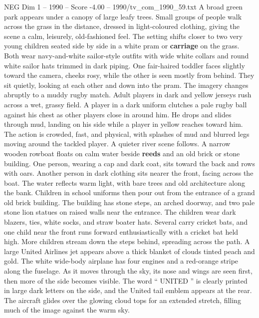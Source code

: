 \begin{textsample}{NEG Dim 1 – 1990 – Score -4.00 – 1990/tv\_com\_1990\_59.txt}  \label{ex:f1_neg_052}
A broad green park appears under a canopy of large leafy trees.
Small groups of people walk across the grass in the distance, dressed in light-coloured clothing, giving the scene a calm, leisurely, old-fashioned feel.
The setting shifts closer to two very young children seated side by side in a white pram or \textbf{carriage} on the grass.
Both wear navy-and-white sailor-style outfits with wide white collars and round white sailor hats trimmed in dark piping.
One fair-haired toddler faces slightly toward the camera, cheeks rosy, while the other is seen mostly from behind.
They sit quietly, looking at each other and down into the pram.
The imagery changes abruptly to a muddy rugby match.
Adult players in dark and yellow jerseys rush across a wet, grassy field.
A player in a dark uniform clutches a pale rugby ball against his chest as other players close in around him.
He drops and slides through mud, landing on his side while a player in yellow reaches toward him.
The action is crowded, fast, and physical, with splashes of mud and blurred legs moving around the tackled player.
A quieter river scene follows.
A narrow wooden rowboat floats on calm water beside \textbf{reeds} and an old brick or stone building.
One person, wearing a cap and dark coat, sits toward the back and rows with oars.
Another person in dark clothing sits nearer the front, facing across the boat.
The water reflects warm light, with bare trees and old architecture along the bank.
Children in school uniforms then pour out from the entrance of a grand old brick building.
The building has stone steps, an arched doorway, and two pale stone lion statues on raised walls near the entrance.
The children wear dark blazers, ties, white socks, and straw boater hats.
Several carry cricket bats, and one child near the front runs forward enthusiastically with a cricket bat held high.
More children stream down the steps behind, spreading across the path.
A large United Airlines jet appears above a thick blanket of clouds tinted peach and gold.
The white wide-body airplane has four engines and a red-orange stripe along the fuselage.
As it moves through the sky, its nose and wings are seen first, then more of the side becomes visible.
The word “ UNITED ” is clearly printed in large dark letters on the side, and the United tail emblem appears at the rear.
The aircraft glides over the glowing cloud tops for an extended stretch, filling much of the image against the warm sky.

\end{textsample}
